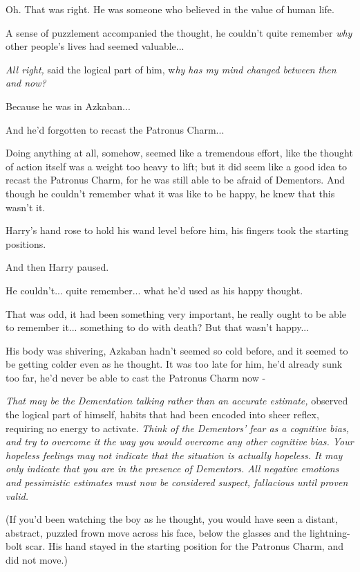 Oh. That was right. He was someone who believed in the value of human
life.

A sense of puzzlement accompanied the thought, he couldn't quite
remember \emph{why} other people's lives had seemed valuable...

\emph{All right,} said the logical part of him, w\emph{hy has my mind
changed between then and now?}

Because he was in Azkaban...

And he'd forgotten to recast the Patronus Charm...

Doing anything at all, somehow, seemed like a tremendous effort, like
the thought of action itself was a weight too heavy to lift; but it did
seem like a good idea to recast the Patronus Charm, for he was still
able to be afraid of Dementors. And though he couldn't remember what it
was like to be happy, he knew that this wasn't it.

Harry's hand rose to hold his wand level before him, his fingers took
the starting positions.

And then Harry paused.

He couldn't... quite remember... what he'd used as his happy
thought.

That was odd, it had been something very important, he really ought to
be able to remember it... something to do with death? But that
wasn't happy...

His body was shivering, Azkaban hadn't seemed so cold before, and it
seemed to be getting colder even as he thought. It was too late for him,
he'd already sunk too far, he'd never be able to cast the Patronus Charm
now -

\emph{That may be the Dementation talking rather than an accurate
estimate,} observed the logical part of himself, habits that had been
encoded into sheer reflex, requiring no energy to activate. \emph{Think
of the Dementors' fear as a cognitive bias, and try to overcome it the
way you would overcome any other cognitive bias. Your hopeless feelings
may not indicate that the situation is actually hopeless. It may only
indicate that you are in the presence of Dementors. All negative
emotions and pessimistic estimates must now be considered suspect,
fallacious until proven valid.}

(If you'd been watching the boy as he thought, you would have seen a
distant, abstract, puzzled frown move across his face, below the glasses
and the lightning-bolt scar. His hand stayed in the starting position
for the Patronus Charm, and did not move.)

